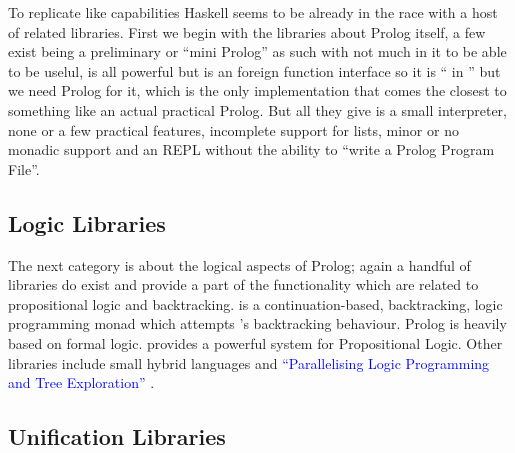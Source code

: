 \documentclass[thesis-solanki.tex]{subfiles}
\begin{document}
To replicate  like
capabilities Haskell seems to be already in the race
with a host of related libraries.
First we begin with the libraries about Prolog itself, a few exist \cite{nanoprolog-lib} being a preliminary or
``mini Prolog'' as such with not much in it to be able to be uselul, \cite{hswip-lib} is all powerful but is an
foreign function interface so it is `` in '' but we need Prolog for it,
\cite{prolog-lib} which is the only implementation that comes the closest to something like an actual practical
Prolog.
But all they give is a small interpreter, none or a few practical features, incomplete support for lists, minor or
no monadic support and an REPL without the ability to ``write a Prolog Program File''.

\subsection{Logic Libraries}

  The next category is about the logical aspects of Prolog; again a handful of libraries do exist and provide a
  part of the functionality which are related
  to propositional logic and backtracking.
  \cite{logict-lib} is a continuation-based, backtracking, logic programming monad which attempts 
  's
  backtracking behaviour.
  Prolog is heavily based on formal logic.
  \cite{proplogic-lib} provides a powerful system for Propositional Logic.
  Other libraries
  include small hybrid languages \cite{cflp-lib} and
  \textcolor{blue}{``Parallelising Logic Programming and Tree Exploration''}
  \cite{logic-grows-on-trees-lib}.


\subsection{Unification Libraries}
\end{document}
